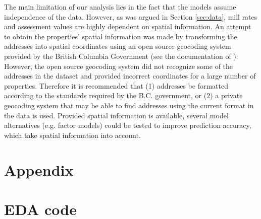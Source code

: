\documentclass{article}
\begin{document}
The main limitation of our analysis lies in the fact that the models assume independence of the data. However, as was argued in Section \ref{sec:data}, mill rates and assessment values are highly dependent on spatial information. An attempt to obtain the properties' spatial information was made by transforming the addresses into spatial coordinates using an open source geocoding system provided by the British Columbia Government (see the documentation of \citet{geopy}). However, the open source geocoding system did not recognize some of the addresses in the dataset and provided incorrect coordinates for a large number of properties.  Therefore it is recommended that (1) addresses be formatted according to the standards required by the B.C. government, or (2) a private geocoding system that may be able to find addresses using the current format in the data is used. Provided spatial information is available, several model alternatives (e.g. factor models) could be tested to improve prediction accuracy, which take spatial information into account.


\newpage
\printbibliography

\clearpage
\appendix
\section*{Appendix}


\section{EDA code}
\end{document}
